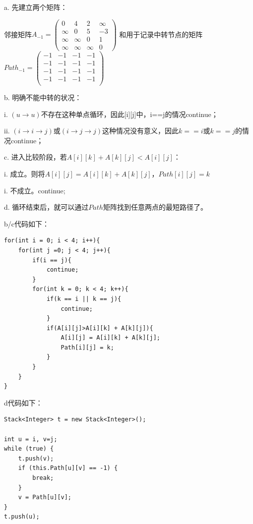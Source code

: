 \documentclass[a4paper]{article}    %
\begin{document}
a. 先建立两个矩阵：

邻接矩阵$A_{-1}=\begin{pmatrix}
    0&4&2&\infty\\
    \infty&0&5&-3\\
    \infty&\infty&0&1\\
    \infty&\infty&\infty&0
\end{pmatrix}$
和用于记录中转节点的矩阵$Path_{-1}=\begin{pmatrix}
    -1&-1&-1&-1\\
    -1&-1&-1&-1\\
    -1&-1&-1&-1\\
    -1&-1&-1&-1\\
\end{pmatrix}$

b. 明确不能中转的状况：

\indent\indent i. $(u \rightarrow u)$不存在这种单点循环，因此[i][j]中，i==j的情况continue；

\indent\indent ii. $(i \rightarrow i \rightarrow j)$或$(i \rightarrow j \rightarrow j)$这种情况没有意义，因此$k == i$或$k==j$的情况continue；

c. 进入比较阶段，若$A[i][k] + A[k][j]<A[i][j]$：

\indent\indent i. 成立。则将$A[i][j] = A[i][k] + A[k][j]$，$Path[i][j] = k$

\indent\indent i. 不成立。continue;

d. 循环结束后，就可以通过$Path$矩阵找到任意两点的最短路径了。

\noindent b/c代码如下：

\begin{lstlisting}
for(int i = 0; i < 4; i++){
    for(int j =0; j < 4; j++){
        if(i == j){
            continue;
        }
        for(int k = 0; k < 4; k++){
            if(k == i || k == j){
                continue;
            }
            if(A[i][j]>A[i][k] + A[k][j]){
                A[i][j] = A[i][k] + A[k][j];
                Path[i][j] = k;
            }
        }
    }
}
\end{lstlisting}

\noindent d代码如下：

\begin{lstlisting}
Stack<Integer> t = new Stack<Integer>();
    
int u = i, v=j;
while (true) {
    t.push(v);
    if (this.Path[u][v] == -1) {
        break;
    }
    v = Path[u][v];
}
t.push(u);
\end{lstlisting}
\end{document}
